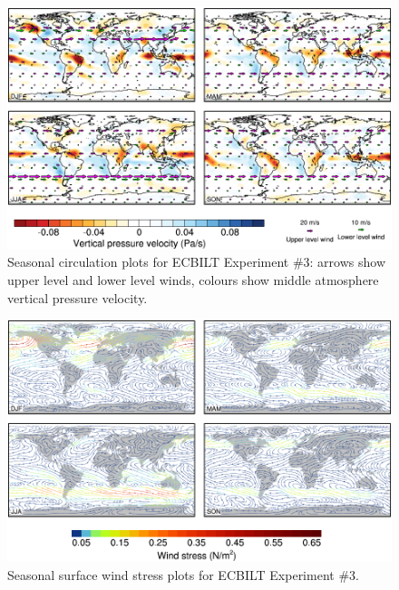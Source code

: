 \documentclass[a4paper,11pt]{article}
\begin{document}
\begin{figure}
  \begin{center}
    \includegraphics[width=\textwidth]{../expt-3/plots/wind-plots}
  \end{center}
  \caption{Seasonal circulation plots for ECBILT Experiment \#3:
    arrows show upper level and lower level winds, colours show middle
    atmosphere vertical pressure velocity.}
  \label{fig:wind-3}
\end{figure}

\begin{figure}
  \begin{center}
    \includegraphics[width=\textwidth]{../expt-3/plots/stress-plots}
  \end{center}
  \caption{Seasonal surface wind stress plots for ECBILT Experiment
    \#3.}
  \label{fig:stress-3}
\end{figure}

\end{document}
